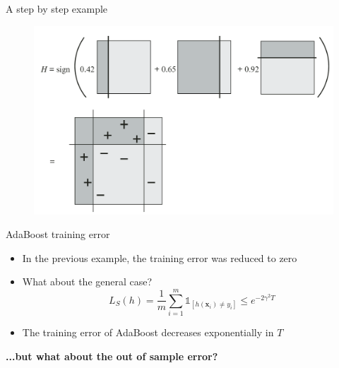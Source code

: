\begin{frame}{A step by step example}
    \begin{figure}
        \includegraphics[width=\textwidth]{img/example_result}
    \end{figure}
\end{frame}

\begin{frame}{AdaBoost training error}
    \begin{itemize} \pause
        \item In the previous example, the training error was reduced to zero \pause
        \item What about the general case? \pause
        \begin{equation*}
            L_S(h) = \frac{1}{m} \sum_{i=1}^m \mathds{1}_{\left[ h(\mathbf{x}_i) \neq y_i \right]} \leq e^{-2 \gamma^2 T}
        \end{equation*} \pause
        \item The training error of AdaBoost decreases exponentially in $T$ \pause
    \end{itemize}
    \textbf{...but what about the out of sample error?}
\end{frame}